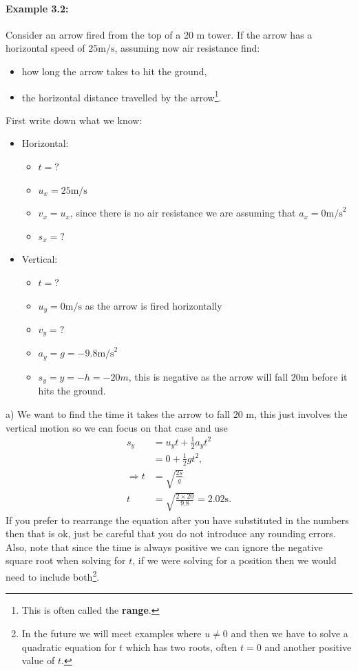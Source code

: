 \paragraph{Example 3.2:} Consider an arrow fired from the top of a 20 m tower. If the arrow has a horizontal speed of $25 \text{m/s}$, assuming now air resistance find:
\begin{itemize}
\setlength{\itemsep}{-5pt}
    \item[a)] how long the arrow takes to hit the ground,
    \item[b)] the horizontal distance travelled by the arrow\footnote{This is often called the \textbf{range}.}.
\end{itemize}


First write down what we know:

\begin{itemize}
\setlength{\itemsep}{-5pt}
    \item Horizontal:
\begin{itemize}
\setlength{\itemsep}{-5pt}
    \item $t=?$
\item $u_{x}=25\text{m/s}$
\item $v_{x}=u_{x}$, since there is no air resistance we are assuming that $a_{x}=0\text{m/s}^{2}$
\item $s_{x}=?$
\end{itemize}
    \item Vertical:
\begin{itemize}
\setlength{\itemsep}{-5pt}
    \item $t=?$
\item $u_{y}=0\text{m/s}$ as the arrow is fired horizontally
\item $v_{y}=?$
\item $a_{y}=g=-9.8\text{m/s}^{2}$
\item $s_{y}=y=-h=-20m$, this is negative as the arrow will fall $20$m before it hits the ground. 
\end{itemize}
\end{itemize}
a) We want to find the time it takes the arrow to fall $20$ m, this just involves the vertical motion so we can focus on that case and use 
\begin{align*}
s_{y}&=u_{y}t+\frac{1}{2}a_{y}t^{2}\\
&=0+\frac{1}{2}gt^{2},\\
\Rightarrow t&=\sqrt{\frac{2s}{g}}\\
t&=\sqrt{\frac{2\times 20}{9.8}}=2.02 \text{s}.
\end{align*}
If you prefer to rearrange the equation after you have substituted in the numbers then that is ok, just be careful that you do not introduce any rounding errors. Also, note that since the time is always positive we can ignore the negative square root when solving for $t$, if we were solving for a position then we would need to include both\footnote{In the future we will meet examples where $u\neq 0$ and then we have to solve a quadratic equation for $t$ which has two roots, often $t=0$ and another positive value of $t$. }.\\

